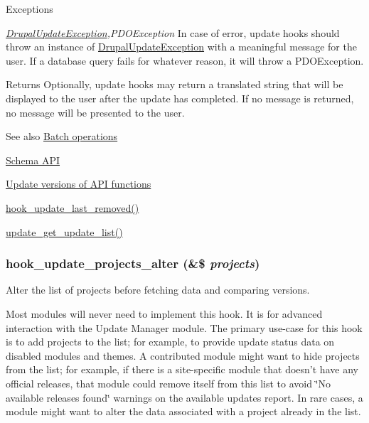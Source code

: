 \begin{DoxyExceptions}{Exceptions}
\item[{\em \hyperlink{classDrupalUpdateException}{DrupalUpdateException},PDOException}]In case of error, update hooks should throw an instance of \hyperlink{classDrupalUpdateException}{DrupalUpdateException} with a meaningful message for the user. If a database query fails for whatever reason, it will throw a PDOException.\end{DoxyExceptions}
\begin{DoxyReturn}{Returns}
Optionally, update hooks may return a translated string that will be displayed to the user after the update has completed. If no message is returned, no message will be presented to the user.
\end{DoxyReturn}
\begin{DoxySeeAlso}{See also}
\hyperlink{group__batch}{Batch operations} 

\hyperlink{group__schemaapi}{Schema API} 

\hyperlink{group__update__api}{Update versions of API functions} 

\hyperlink{group__hooks_ga2fc0f6e61d252afa19e87804dbfdb558}{hook\_\-update\_\-last\_\-removed()} 

\hyperlink{update_8inc_ae95fb5ec58e85fd5c10c56345fd7cabe}{update\_\-get\_\-update\_\-list()} 
\end{DoxySeeAlso}
\hypertarget{group__hooks_gaed261bce503f9437df042668cc070bf7}{
\subsubsection[{hook\_\-update\_\-projects\_\-alter}]{\setlength{\rightskip}{0pt plus 5cm}hook\_\-update\_\-projects\_\-alter (\&\$ {\em projects})}}
\label{group__hooks_gaed261bce503f9437df042668cc070bf7}
Alter the list of projects before fetching data and comparing versions.

Most modules will never need to implement this hook. It is for advanced interaction with the Update Manager module. The primary use-\/case for this hook is to add projects to the list; for example, to provide update status data on disabled modules and themes. A contributed module might want to hide projects from the list; for example, if there is a site-\/specific module that doesn't have any official releases, that module could remove itself from this list to avoid \char`\"{}No available releases found\char`\"{} warnings on the available updates report. In rare cases, a module might want to alter the data associated with a project already in the list.


